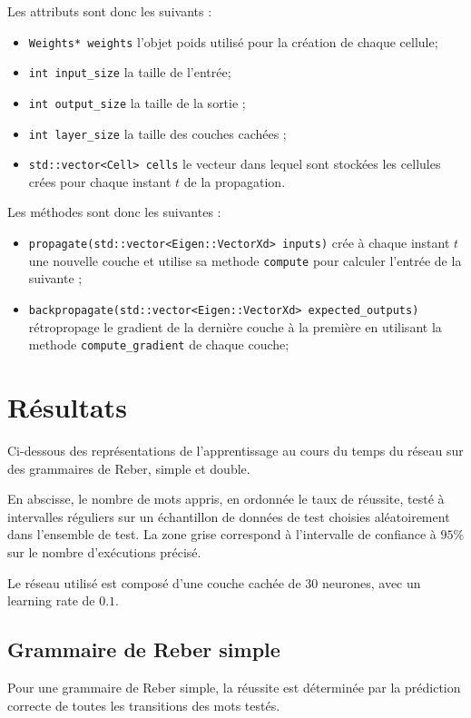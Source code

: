 \medskip

Les attributs sont donc les suivants :

\begin{itemize}
  \item \verb+Weights* weights+ l'objet poids utilisé pour la création de
    chaque cellule;
  \item \verb+int input_size+ la taille de l'entrée;
  \item \verb+int output_size+ la taille de la sortie ;
  \item \verb+int layer_size+ la taille des couches cachées ;
  \item \verb+std::vector<Cell> cells+ le vecteur dans lequel sont stockées les
    cellules crées pour chaque instant $t$ de la propagation.
\end{itemize}

\bigskip

Les méthodes sont donc les suivantes :

\begin{itemize}
  \item \verb+propagate(std::vector<Eigen::VectorXd> inputs)+ crée à chaque
    instant $t$ une nouvelle couche et utilise sa methode \verb+compute+
    pour calculer l'entrée de la suivante ;
  \item \verb+backpropagate(std::vector<Eigen::VectorXd> expected_outputs)+
    rétropropage le gradient de la dernière couche à la première en utilisant
    la methode \verb+compute_gradient+ de chaque couche;
\end{itemize}

\section{Résultats}
Ci-dessous des représentations de l'apprentissage au cours du temps du réseau sur des
grammaires de Reber, simple et double.

\smallskip

En abscisse, le nombre de mots appris, en ordonnée le taux de réussite, testé à
intervalles réguliers sur un échantillon de données de test choisies aléatoirement
dans l'ensemble de test. La zone grise correspond à l'intervalle de confiance à
$95\%$ sur le nombre d'exécutions précisé.

\smallskip

Le réseau utilisé est composé d'une couche cachée de 30 neurones, avec un learning
rate de $0.1$.

\subsection{Grammaire de Reber simple}
Pour une grammaire de Reber simple, la réussite est déterminée par la prédiction
correcte de toutes les transitions des mots testés.

